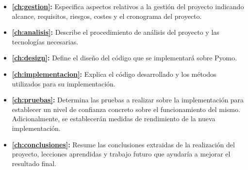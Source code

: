 \begin{itemize}
    \item \textbf{\autoref{ch:gestion}: } Especifica aspectos relativos a la gestión del proyecto indicando alcance, requisitos, riesgos, costes y el cronograma del proyecto.
    \item \textbf{\autoref{ch:analisis}: } Describe el procedimiento de análisis del proyecto y las tecnologías necesarias.
    \item \textbf{\autoref{ch:design}: } Define el diseño del código que se implementará sobre Pyomo.
    \item \textbf{\autoref{ch:implementacion}: } Explica el código desarrollado y los métodos utilizados para su implementación.
    \item \textbf{\autoref{ch:pruebas}: } Determina las pruebas a realizar sobre la implementación para establecer un nivel de confianza concreto sobre el funcionamiento del mismo. Adicionalmente, se establecerán medidas de rendimiento de la nueva implementación.
    \item \textbf{\autoref{ch:conclusiones}: } Resume las conclusiones extraidas de la realización del proyecto, lecciones aprendidas y trabajo futuro que ayudaría a mejorar el resultado final.
\end{itemize}